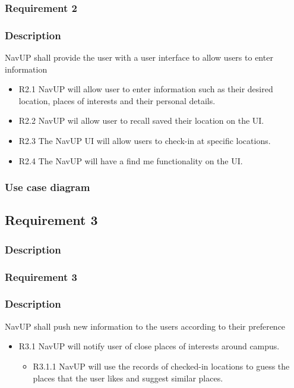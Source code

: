 \documentclass{article}
\begin{document}
        \subsubsection{Requirement 2}
        \subsubsection*{Description}

        NavUP shall provide the user with a user interface to allow users to enter information
        \begin{itemize}
        \item R2.1 NavUP will allow user to enter information such as their desired location, places of interests and their personal details.
        \item R2.2 NavUP wil allow user to recall saved their location on the UI.
        \item R2.3 The NavUP UI will allow users to check-in at specific locations.
        \item R2.4 The NavUP will have a find me functionality on the UI.
        \end{itemize}
        \subsubsection{Use case diagram}
        \subsection{Requirement 3}
        \subsubsection{Description}
        \subsubsection{Requirement 3}
        \subsubsection*{Description}
        NavUP shall push new information to the users according to their preference
        \begin{itemize}
        \item R3.1 NavUP will notify user of close places of interests around campus.
        \begin{itemize}
        \item R3.1.1 NavUP will use the records of checked-in locations to guess the places that the user likes and suggest similar places. 
        \end{itemize}
        \end{itemize}
\end{document}
